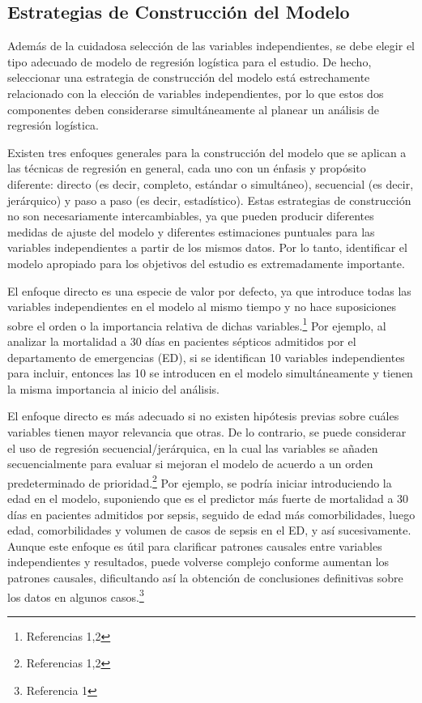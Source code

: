 \documentclass[12pt]{article}
\begin{document}
\subsection*{Estrategias de Construcci\'on del Modelo}

Adem\'as de la cuidadosa selecci\'on de las variables independientes, se debe elegir el tipo adecuado de modelo de regresi\'on log\'istica para el estudio. De hecho, seleccionar una estrategia de construcci\'on del modelo est\'a estrechamente relacionado con la elecci\'on de variables independientes, por lo que estos dos componentes deben considerarse simult\'aneamente al planear un an\'alisis de regresi\'on log\'istica.

Existen tres enfoques generales para la construcci\'on del modelo que se aplican a las t\'ecnicas de regresi\'on en general, cada uno con un \'enfasis y prop\'osito diferente: directo (es decir, completo, est\'andar o simult\'aneo), secuencial (es decir, jer\'arquico) y paso a paso (es decir, estad\'istico). Estas estrategias de construcci\'on no son necesariamente intercambiables, ya que pueden producir diferentes medidas de ajuste del modelo y diferentes estimaciones puntuales para las variables independientes a partir de los mismos datos. Por lo tanto, identificar el modelo apropiado para los objetivos del estudio es extremadamente importante.

El enfoque directo es una especie de valor por defecto, ya que introduce todas las variables independientes en el modelo al mismo tiempo y no hace suposiciones sobre el orden o la importancia relativa de dichas variables.\footnote{Referencias 1,2} Por ejemplo, al analizar la mortalidad a 30 d\'ias en pacientes s\'epticos admitidos por el departamento de emergencias (ED), si se identifican 10 variables independientes para incluir, entonces las 10 se introducen en el modelo simult\'aneamente y tienen la misma importancia al inicio del an\'alisis.

El enfoque directo es m\'as adecuado si no existen hip\'otesis previas sobre cu\'ales variables tienen mayor relevancia que otras. De lo contrario, se puede considerar el uso de regresi\'on secuencial/jer\'arquica, en la cual las variables se a\~naden secuencialmente para evaluar si mejoran el modelo de acuerdo a un orden predeterminado de prioridad.\footnote{Referencias 1,2} Por ejemplo, se podr\'ia iniciar introduciendo la edad en el modelo, suponiendo que es el predictor m\'as fuerte de mortalidad a 30 d\'ias en pacientes admitidos por sepsis, seguido de edad m\'as comorbilidades, luego edad, comorbilidades y volumen de casos de sepsis en el ED, y as\'i sucesivamente. Aunque este enfoque es \'util para clarificar patrones causales entre variables independientes y resultados, puede volverse complejo conforme aumentan los patrones causales, dificultando as\'i la obtenci\'on de conclusiones definitivas sobre los datos en algunos casos.\footnote{Referencia 1}
\end{document}
